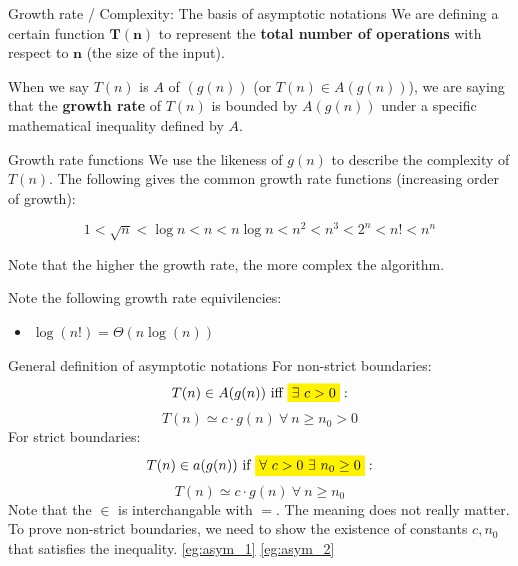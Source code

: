 \begin{theorem}
    {Growth rate / Complexity: The basis of asymptotic notations}
    We are defining a certain function $\mathbf{T(n)}$ to represent the \textbf{total number of operations} with respect to $\mathbf{n}$ (the size of the input).

    When we say $T(n)$ is $A$ of $(g(n))$ (or $T(n)\in A(g(n))$), we are saying that the \textbf{growth rate} of $T(n)$ is bounded by $A(g(n))$ under a specific mathematical inequality defined by $A$.
\end{theorem}

\begin{knBox}
    {Growth rate functions}
    We use the likeness of $g(n)$ to describe the complexity of $T(n)$. The following gives the common growth rate functions (increasing order of growth):

    \[
        1 < \sqrt{n} < \log n < n < n\log n < n^2 < n^3 < 2^n < n! < n^n
    \]

    Note that the higher the growth rate, the more complex the algorithm.

    Note the following growth rate equivilencies:
    \begin{itemize}
        \item $\log(n!)=\Theta(n\log(n))$
    \end{itemize}
\end{knBox}

\begin{definition}
    {General definition of asymptotic notations}
    For non-strict boundaries:
    \[T(n) \in A(g(n))\ \text{iff}\ \mathcolorbox{yellow}{\exists\ c > 0}:\]
    \[T(n) \simeq c\cdot g(n)\ \forall\ n \geq n_0 > 0\]
    For strict boundaries:
    \[T(n) \in a(g(n))\ \text{if}\ \mathcolorbox{yellow}{\forall\ c > 0\ \exists\ n_0 \geq 0}:\]
    \[T(n) \simeq c\cdot g(n)\ \forall\ n \geq n_0\]
    Note that the $\in$ is interchangable with $=$. The meaning does not really matter.
    \tcblower
    To prove non-strict boundaries, we need to show the existence of constants $c, n_0$ that satisfies the inequality.
    \label{def:asym}
    \ref{eg:asym_1} \ref{eg:asym_2}
\end{definition}

